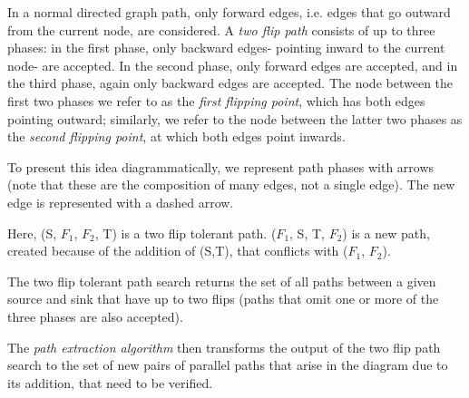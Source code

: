 \documentclass[sigplan,review,anonymous]{acmart}
\begin{document}
In a normal directed graph path, only forward edges, i.e. edges that go outward from the current node, are considered. 
A \textit{two flip path} consists of up to three phases: in the first phase, only backward edges- pointing inward to the current node- are accepted. In the second phase, only forward edges are accepted, and in the third phase, again only backward edges are accepted. The node between the first two phases we refer to as the \textit{first flipping point}, which has both edges pointing outward; similarly, we refer to the node between the latter two phases as the \textit{second flipping point}, at which both edges point inwards.

To present this idea diagrammatically, we represent path phases with arrows (note that these are the composition of many edges, not a single edge). The new edge is represented with a dashed arrow.

\begin{center}
\end{center}
Here, (S, $F_1$, $F_2$, T) is a two flip tolerant path. ($F_1$, S, T, $F_2$) is a new path, created because of the addition of (S,T), that conflicts with ($F_1$, $F_2$).

The two flip tolerant path search returns the set of all paths between a given source and sink that have up to two flips (paths that omit one or more of the three phases are also accepted).

The \textit{path extraction algorithm} then transforms the output of the two flip path search to the set of new pairs of parallel paths that arise in the diagram due to its addition, that need to be verified.
\end{document}
